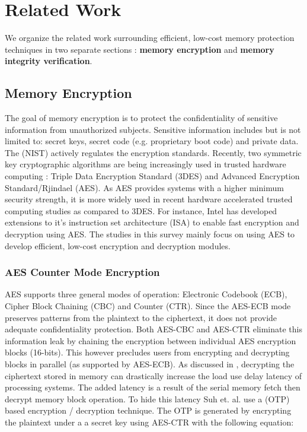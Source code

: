 \section{Related Work}
\label{sec-related}

We organize the related work surrounding efficient, low-cost memory protection
techniques in two separate sections : \textbf{memory encryption} and
\textbf{memory integrity verification}.

\subsection{Memory Encryption}
The goal of memory encryption is to protect the confidentiality of
sensitive information from unauthorized subjects. Sensitive information
includes but is not limited to: secret keys, secret code (e.g. proprietary boot
code) and private data. The 
(NIST) actively regulates the encryption standards. Recently, two symmetric key
cryptographic algorithms are being increasingly used in trusted hardware
computing : Triple Data Encryption Standard (3DES) and Advanced Encryption
Standard/Rjindael (AES). As AES provides systems with a higher minimum security
strength, it is more widely used in recent hardware accelerated trusted
computing studies as compared to 3DES. For instance, Intel has developed
extensions to it's instruction set architecture (ISA) to enable fast encryption
and decryption using AES. The studies in this survey mainly focus on using AES
to develop efficient, low-cost encryption and decryption modules.

\subsubsection{AES Counter Mode Encryption}
AES supports three general modes of operation: Electronic Codebook (ECB),
Cipher Block Chaining (CBC) and Counter (CTR). Since the AES-ECB mode preserves
patterns from the plaintext to the ciphertext, it does not provide adequate
confidentiality protection. Both AES-CBC and AES-CTR eliminate this information
leak by chaining the encryption between individual AES encryption blocks
(16-bits). This however precludes users from encrypting and decrypting blocks
in parallel (as supported by AES-ECB). As discussed in \cite{suh-memIntEnc},
decrypting the ciphertext stored in memory can drastically increase the load
use delay latency of processing systems. The added latency is a result of the
serial memory fetch then decrypt memory block operation. To hide this latency
Suh et. al. use a  (OTP) based encryption / decryption
technique. The OTP is generated by encrypting the plaintext under a a secret
key using AES-CTR with the following equation:

